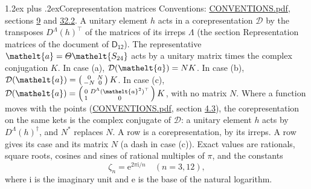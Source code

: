 \documentclass[10pt,a4paper]{article}
\makeatletter
\renewcommand\section{\@startsection{section}{1}{\z@}{-3ex plus -1ex minus -.2ex}%
  {1.2ex plus .2ex}{\normalfont\large\sffamily\bfseries\color{parttitle}}}
\numberwithin{equation}{section}
\newcommand{\eltfont}[1]{{\let\sigma\eltsigma\mathelt{#1}}}
\newcommand{\grp}[1]{\mathsf{#1}}
\newcommand{\elt}[1]{\eltfont{#1}}
\newcommand{\iunit}{\mathrm{i}}
\newcommand{\expe}{\mathrm{e}}
\newcommand{\rootunity}[1]{\zeta_{#1}}
\makeatother
\begin{document}
\section{Corepresentation matrices}\label{s:corep_matrices}
Conventions: \href{../../CONVENTIONS.pdf}{CONVENTIONS.pdf}, sections \href{../../../rotation/CONVENTIONS.pdf\#conv.9}{9} and \href{../../CONVENTIONS.pdf\#conv.32.2}{32.2}.
A unitary element $h$ acts in a corepresentation $\mathcal{D}$ by the transposes $D^{\Lambda}(h)^{\top}$ of the matrices of its irreps $\Lambda$ (the section Representation matrices of the document of \href{../../../rotation/data/pdf/D12.pdf}{$\grp{D_{12}}$}). The representative $\elt{a} = \varTheta\elt{S_{24}}$ acts by a unitary matrix times the complex conjugation $K$.
In case (a), $\mathcal{D}(\elt{a}) = NK$. In case (b), $\mathcal{D}(\elt{a}) = \left(\begin{smallmatrix} 0 & N \\ -N & 0 \end{smallmatrix}\right) K$. In case (c), $\mathcal{D}(\elt{a}) = \left(\begin{smallmatrix} 0 & D^{\Lambda}(\elt{a}^2)^{\top} \\ 1 & 0 \end{smallmatrix}\right) K$, with no matrix $N$.
Where a function moves with the points (\href{../../CONVENTIONS.pdf}{CONVENTIONS.pdf}, section \href{../../../rotation/CONVENTIONS.pdf\#conv.4.3}{4.3}), the corepresentation on the same kets is the complex conjugate of $\mathcal{D}$: a unitary element $h$ acts by $D^{\Lambda}(h)^{\dagger}$, and $N^{*}$ replaces $N$.
A row is a corepresentation, by its irreps. A row gives its case and its matrix $N$ (a dash in case (c)).
\leavevmode\label{n:constant.root}\label{n:index.root.order}Exact values are rationals, square roots, cosines and sines of rational multiples of $\pi$, and the constants
\begin{equation}\label{e:constants}\rootunity{n} = \expe^{2\pi\iunit/n}\quad(n = 3, 12),\end{equation}
where $\iunit$ is the imaginary unit and $\expe$ is the base of the natural logarithm.
\end{document}
